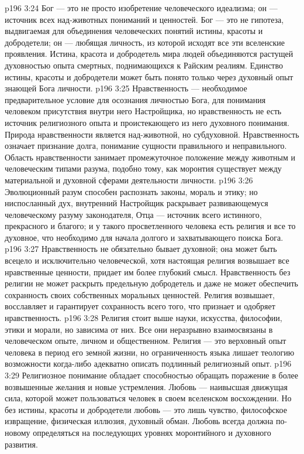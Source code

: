 \vs p196 3:24 Бог --- это не просто изобретение человеческого идеализма; он --- источник всех над\hyp{}животных пониманий и ценностей. Бог --- это не гипотеза, выдвигаемая для объединения человеческих понятий истины, красоты и добродетели; он --- любящая личность, из которой исходят все эти вселенские проявления. Истина, красота и добродетель мира людей объединяются растущей духовностью опыта смертных, поднимающихся к Райским реалиям. Единство истины, красоты и добродетели может быть понято только через духовный опыт знающей Бога личности.
\vs p196 3:25 Нравственность --- необходимое предварительное условие для осознания личностью Бога, для понимания человеком присутствия внутри него Настройщика, но нравственность не есть источник религиозного опыта и проистекающего из него духовного понимания. Природа нравственности является над\hyp{}животной, но субдуховной. Нравственность означает признание долга, понимание сущности правильного и неправильного. Область нравственности занимает промежуточное положение между животным и человеческим типами разума, подобно тому, как моронтия существует между материальной и духовной сферами деятельности личности.
\vs p196 3:26 Эволюционный разум способен распознать законы, мораль и этику; но ниспосланный дух, внутренний Настройщик раскрывает развивающемуся человеческому разуму законодателя, Отца --- источник всего истинного, прекрасного и благого; и у такого просветленного человека есть религия и все то духовное, что необходимо для начала долгого и захватывающего поиска Бога.
\vs p196 3:27 Нравственность не обязательно бывает духовной; она может быть всецело и исключительно человеческой, хотя настоящая религия возвышает все нравственные ценности, придает им более глубокий смысл. Нравственность без религии не может раскрыть предельную добродетель и даже не может обеспечить сохранность своих собственных моральных ценностей. Религия возвышает, восславляет и гарантирует сохранность всего того, что признает и одобряет нравственность.
\vs p196 3:28 Религия стоит выше науки, искусства, философии, этики и морали, но зависима от них. Все они неразрывно взаимосвязаны в человеческом опыте, личном и общественном. Религия --- это верховный опыт человека в период его земной жизни, но ограниченность языка лишает теологию возможности когда\hyp{}либо адекватно описать подлинный религиозный опыт.
\vs p196 3:29 \pc Религиозное понимание обладает способностью обращать поражение в более возвышенные желания и новые устремления. Любовь --- наивысшая движущая сила, которой может пользоваться человек в своем вселенском восхождении. Но без истины, красоты и добродетели любовь --- это лишь чувство, философское извращение, физическая иллюзия, духовный обман. Любовь всегда должна по\hyp{}новому определяться на последующих уровнях моронтийного и духовного развития.

